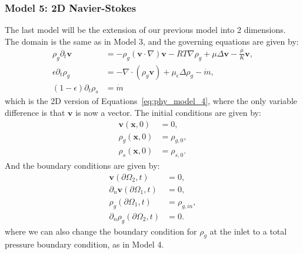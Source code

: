 \subsubsection*{Model 5: 2D Navier-Stokes}
The last model will be the extension of our previous model into 2 dimensions. The domain is the same as in Model 3, and the governing equations are given by:
\begin{subequations}\label{eq:phy_model_5}
    \begin{align}
        \rho_g \partial_t \mathbf{v}  &= - \rho_g (\mathbf{v} \cdot \nabla) \mathbf{v} - RT\nabla \rho_g  + \mu \Delta \mathbf{v} - \frac{\mu}{K} \mathbf{v}, \\
        \epsilon\partial_t \rho_g &= -\nabla \cdot (\rho_g \mathbf{v}) + \mu_\epsilon \Delta \rho_g - \dot{m}, \\
        (1-\epsilon)\partial_t \rho_s &= \dot{m}
    \end{align}
\end{subequations}
which is the 2D version of Equations~\ref{eq:phy_model_4}, where the only variable difference is that $\mathbf{v}$ is now a vector. The initial conditions are given by:
\begin{subequations}\label{eq:phy_model_5_ic}
    \begin{align}
        \mathbf{v}(\mathbf{x},0) &= 0, \\
        \rho_g(\mathbf{x},0) &= \rho_{g,0}, \\
        \rho_s(\mathbf{x},0) &= \rho_{s,0}.
    \end{align}
\end{subequations}
And the boundary conditions are given by:
\begin{subequations}\label{eq:phy_model_5_bc}
    \begin{align}
        \mathbf{v}(\partial\Omega_2,t) &= 0, \\
        \partial_n \mathbf{v}(\partial\Omega_1,t) &= 0, \\
        \rho_g(\partial\Omega_1,t) &= \rho_{g,in}, \\
        \partial_n \rho_g(\partial\Omega_2,t) &= 0.
    \end{align}
\end{subequations}
where we can also change the boundary condition for $\rho_g$ at the inlet to a total pressure boundary condition, as in Model 4.
